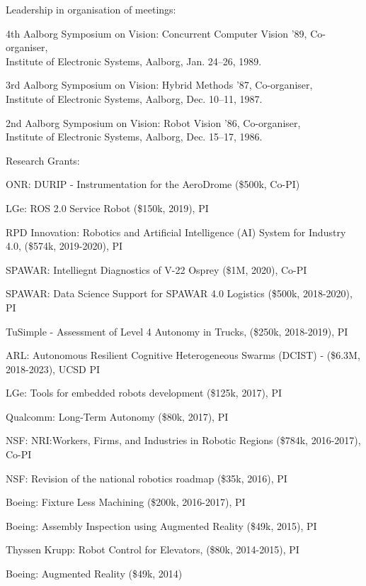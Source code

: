 \documentclass{article}
\begin{document}
\begin{cv}
\begin{cvlist}{Leadership in organisation of meetings:}
\item 4th Aalborg Symposium on Vision: Concurrent Computer Vision '89,
  Co-organiser, \\ Institute of Electronic Systems, Aalborg,
  \cftdotfill{\cftdotsep} Jan. 24--26, 1989.
\item 3rd Aalborg Symposium on Vision: Hybrid Methods '87,
  Co-organiser, \\ Institute of Electronic Systems, Aalborg,
  \cftdotfill{\cftdotsep} Dec. 10--11, 1987.
\item 2nd Aalborg Symposium on Vision: Robot Vision '86, Co-organiser,
  \\ Institute of Electronic Systems, Aalborg, \cftdotfill{\cftdotsep}
  Dec. 15--17, 1986.
\end{cvlist}

\begin{cvlist}{Research Grants:}
\item ONR: DURIP - Instrumentation for the AeroDrome (\$500k, Co-PI)
\item LGe: ROS 2.0 Service Robot (\$150k, 2019), PI   
\item RPD Innovation: Robotics and Artificial Intelligence (AI) System for 
  Industry 4.0, (\$574k, 2019-2020), PI 
\item SPAWAR: Intelliegnt Diagnostics of V-22 Osprey (\$1M, 2020), Co-PI   
\item SPAWAR: Data Science Support for SPAWAR 4.0 Logistics (\$500k,
  2018-2020), PI
\item TuSimple - Assessment of Level 4 Autonomy in Trucks,  (\$250k,
  2018-2019), PI
\item ARL: Autonomous Resilient Cognitive Heterogeneous Swarms
  (DCIST) - (\$6.3M, 2018-2023), UCSD PI
\item LGe: Tools for embedded robots development (\$125k, 2017), PI
\item Qualcomm: Long-Term Autonomy (\$80k, 2017), PI
\item NSF: NRI:Workers, Firms, and Industries in Robotic Regions
  (\$784k, 2016-2017), Co-PI
\item NSF: Revision of the national robotics roadmap (\$35k, 2016), PI
\item Boeing: Fixture Less Machining (\$200k, 2016-2017), PI
\item Boeing: Assembly Inspection using Augmented Reality (\$49k,
  2015), PI
\item Thyssen Krupp: Robot Control for Elevators, (\$80k, 2014-2015), PI
\item Boeing: Augmented Reality (\$49k, 2014)

\end{cvlist}
\end{cv}
\end{document}
